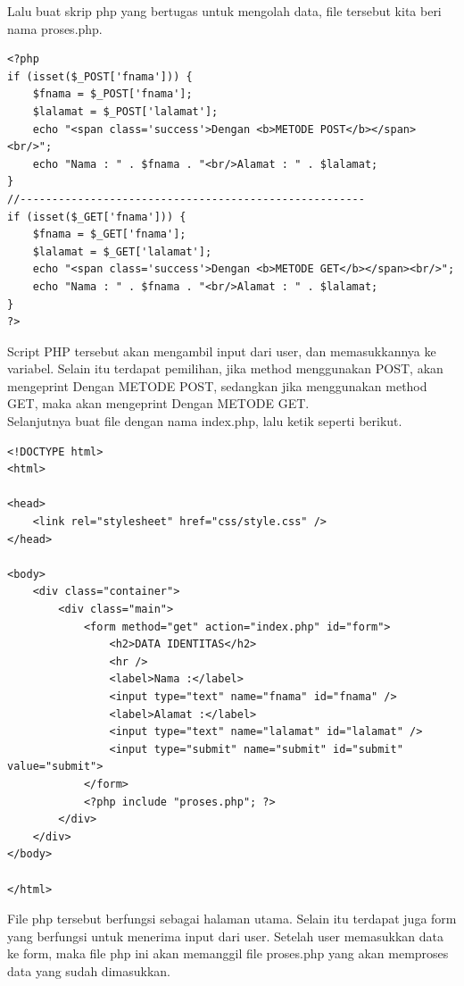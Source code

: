 \documentclass[a4paper,12pt]{article}
\begin{document}
Lalu buat skrip php yang bertugas untuk mengolah data, file tersebut kita beri nama proses.php.
\begin{lstlisting}[style=PHP]
<?php
if (isset($_POST['fnama'])) {
    $fnama = $_POST['fnama'];
    $lalamat = $_POST['lalamat'];
    echo "<span class='success'>Dengan <b>METODE POST</b></span><br/>";
    echo "Nama : " . $fnama . "<br/>Alamat : " . $lalamat;
}
//------------------------------------------------------
if (isset($_GET['fnama'])) {
    $fnama = $_GET['fnama'];
    $lalamat = $_GET['lalamat'];
    echo "<span class='success'>Dengan <b>METODE GET</b></span><br/>";
    echo "Nama : " . $fnama . "<br/>Alamat : " . $lalamat;
}
?>
\end{lstlisting}
Script PHP tersebut akan mengambil input dari user, dan memasukkannya ke variabel. Selain itu terdapat pemilihan, jika method menggunakan POST, akan mengeprint Dengan METODE POST, sedangkan jika menggunakan method GET, maka akan mengeprint Dengan METODE GET.\\[2ex]

Selanjutnya buat file dengan nama index.php, lalu ketik seperti berikut.
\begin{lstlisting}[style=PHP]
<!DOCTYPE html>
<html>

<head>
    <link rel="stylesheet" href="css/style.css" />
</head>

<body>
    <div class="container">
        <div class="main">
            <form method="get" action="index.php" id="form">
                <h2>DATA IDENTITAS</h2>
                <hr />
                <label>Nama :</label>
                <input type="text" name="fnama" id="fnama" />
                <label>Alamat :</label>
                <input type="text" name="lalamat" id="lalamat" />
                <input type="submit" name="submit" id="submit" value="submit">
            </form>
            <?php include "proses.php"; ?>
        </div>
    </div>
</body>

</html>
\end{lstlisting}
File php tersebut berfungsi sebagai halaman utama. Selain itu terdapat juga form yang berfungsi untuk menerima input dari user. Setelah user memasukkan data ke form, maka file php
ini akan memanggil file proses.php yang akan memproses data yang sudah dimasukkan.\\[2ex]
\end{document}
